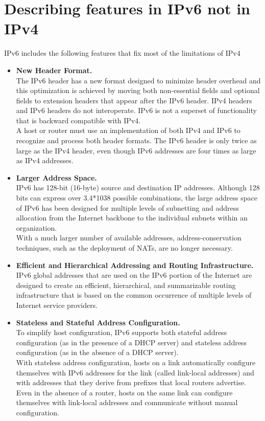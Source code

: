 \section{Describing features in IPv6 not in IPv4}
IPv6 includes the following features that fix most of the limitations of IPv4
\begin{itemize}
\item \textbf{New Header Format.}
\\ The IPv6 header has a new format designed to minimize header overhead and this optimization is achieved by moving both non-essential fields and optional fields to extension headers that appear after the IPv6 header. IPv4 headers and IPv6 headers do not interoperate. IPv6 is not a superset of functionality that is backward compatible with IPv4.
\\A host or router must use an implementation of both IPv4 and IPv6 to recognize and process both header formats. The IPv6 header is only twice as large as the IPv4 header, even though IPv6 addresses are four times as large as IPv4 addresses.
 \item \textbf{Larger Address Space.}
\\ IPv6 has 128-bit (16-byte) source and destination IP addresses. Although 128 bits can express over 3.4*1038 possible combinations, the large address space of IPv6 has been designed for multiple levels of subnetting and address allocation from the Internet backbone to the individual subnets within an organization. 
\\With a much larger number of available addresses, address-conservation techniques, such as the deployment of NATs, are no longer necessary.
\item \textbf{Efficient and Hierarchical Addressing and Routing Infrastructure.}
\\IPv6 global addresses that are used on the IPv6 portion of the Internet are designed to create an efficient, hierarchical, and summarizable routing infrastructure that is based on the common occurrence of multiple levels of Internet service providers.
\item \textbf{Stateless and Stateful Address Configuration.}
\\ To simplify host configuration, IPv6 supports both stateful address configuration (as in the presence of a DHCP server) and stateless address configuration (as in the absence of a DHCP server).
\\With stateless address configuration, hosts on a link automatically configure themselves with IPv6 addresses for the link (called link-local addresses) and with addresses that they derive from prefixes that local routers advertise. Even in the absence of a router, hosts on the same link can configure themselves with link-local addresses and communicate without manual configuration.

\end{itemize}
